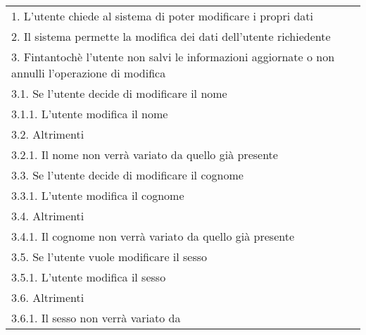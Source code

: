 \begin{table}[H]
\begin{longtable}{@{}|>{\centering\arraybackslash}m{.2\textwidth}|m{.7\textwidth}|@{}}
		Sequenza delle azioni & \begin{tabular}{m{0.9\linewidth}}\hspace{0.0cm}1. L'utente chiede al sistema di poter modificare i propri dati\\\hspace{0.0cm}2. Il sistema permette la modifica dei dati dell'utente richiedente\\\hspace{0.0cm}3. Fintantochè l'utente non salvi le informazioni aggiornate o non annulli l'operazione di modifica\\\hspace{0.5cm}\hspace{0.0cm}3.1. Se l'utente decide di modificare il nome\\\hspace{1.0cm}\hspace{0.5cm}\hspace{0.0cm}3.1.1. L'utente modifica il nome\\\hspace{0.5cm}\hspace{0.0cm}3.2. Altrimenti\\\hspace{1.0cm}\hspace{0.5cm}\hspace{0.0cm}3.2.1. Il nome non verrà variato da quello già presente\\\hspace{0.5cm}\hspace{0.0cm}3.3. Se l'utente decide di modificare il cognome\\\hspace{1.0cm}\hspace{0.5cm}\hspace{0.0cm}3.3.1. L'utente modifica il cognome\\\hspace{0.5cm}\hspace{0.0cm}3.4. Altrimenti\\\hspace{1.0cm}\hspace{0.5cm}\hspace{0.0cm}3.4.1. Il cognome non verrà variato da quello già presente\\\hspace{0.5cm}\hspace{0.0cm}3.5. Se l'utente vuole modificare il sesso\\\hspace{1.0cm}\hspace{0.5cm}\hspace{0.0cm}3.5.1. L'utente modifica il sesso\\\hspace{0.5cm}\hspace{0.0cm}3.6. Altrimenti\\\hspace{1.0cm}\hspace{0.5cm}\hspace{0.0cm}3.6.1. Il sesso non verrà variato da 
\end{longtable}
\end{table}
